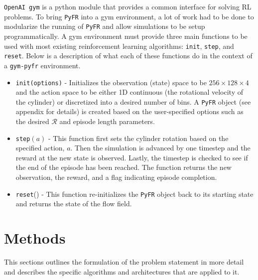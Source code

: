 \documentclass{article}
\begin{document}
\verb|OpenAI gym| is a python module that provides a common interface for solving RL problems. To bring \verb|PyFR| into a gym environment, a lot of work had to be done to modularize the running of \verb|PyFR| and allow simulations to be setup programmatically. A gym environment must provide three main functions to be used with most existing reinforcement learning algorithms: \verb|init|, \verb|step|, and \verb|reset|. Below is a description of what each of these functions do in the context of a \verb|gym-pyfr| environment.

\begin{itemize}
    \item \verb|init(options)| - Initializes the observation (state) space to be $256 \times 128 \times 4$ and the action space to be either 1D continuous (the rotational velocity of the cylinder) or discretized into a desired number of bins. A \verb|PyFR| object (see appendix for details) is created based on the user-specified options such as the desired $\mathcal{R}$ and episode length parameters.
    \item \verb|step|$(a)$ - This function first sets the cylinder rotation based on the specified action, $a$. Then the simulation is advanced by one timestep and the reward at the new state is observed. Lastly, the timestep is checked to see if the end of the episode has been reached. The function returns the new observation, the reward, and a flag indicating episode completion.
    \item \verb|reset|() - This function re-initializes the \verb|PyFR| object back to its starting state and returns the state of the flow field.
\end{itemize}


\section{ Methods }
\label{sec:methods}
This sections outlines the formulation of the problem statement in more detail and describes the specific algorithms and architectures that are applied to it. 
\end{document}
